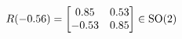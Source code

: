 \documentclass[preview]{standalone}
\begin{document}
\begin{align*}
\special{dvisvgm:raw <g id='unique000'>}R(-0.56) = \begin{bmatrix} 0.85 & 0.53 \\ -0.53 & 0.85 \end{bmatrix} \in \text{SO}(2)\special{dvisvgm:raw </g>}
\end{align*}
\end{document}
